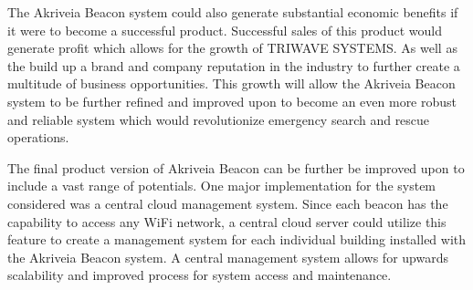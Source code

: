 \bigskip
The Akriveia Beacon system could also generate substantial economic benefits if it were to become a successful product. Successful sales of this product would generate profit which allows for the growth of TRIWAVE SYSTEMS. As well as the build up a brand and company reputation in the industry to further create a multitude of business opportunities. This growth will allow the Akriveia Beacon system to be further refined and improved upon to become an even more robust and reliable system which would revolutionize emergency search and rescue operations.

\bigskip
The final product version of Akriveia Beacon can be further be improved upon to include a vast range of potentials. One major implementation for the system considered was a central cloud management system. Since each beacon has the capability to access any WiFi network, a central cloud server could utilize this feature to create a management system for each individual building installed with the Akriveia Beacon system. A central management system allows for upwards scalability and improved process for system access and maintenance.




